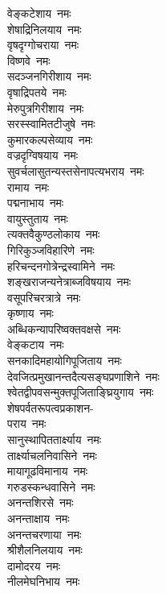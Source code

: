 \begin{multicols}{2}
\begin{flushleft}
वेङ्कटेशाय~नमः\\
शेषाद्रिनिलयाय~नमः\\
वृषदृग्गोचराया~नमः\\
विष्णवे~नमः\\
सदञ्जनगिरीशाय~नमः\\
वृषाद्रिपतये~नमः\\
मेरुपुत्रगिरीशाय~नमः\\
सरस्स्वामितटीजुषे~नमः\\
कुमारकल्पसेव्याय~नमः\\
वज्रदृग्विषयाय~नमः\hfill{}\\
सुवर्चलासुत\-न्यस्तसेनापत्यभराय~नमः\\
रामाय~नमः\\
पद्मनाभाय~नमः\\
वायुस्तुताय~नमः\\
त्यक्तवैकुण्ठलोकाय~नमः\\
गिरिकुञ्जविहारिणे~नमः\\
हरिचन्दनगोत्रेन्द्रस्वामिने~नमः\\
शङ्खराजन्यनेत्राब्जविषयाय~नमः\\
वसूपरिचरत्रात्रे~नमः\\
कृष्णाय~नमः\hfill{}\\
अब्धिकन्यापरिष्वक्तवक्षसे~नमः\\
वेङ्कटाय~नमः\\
सनकादिमहायोगि\-पूजिताय~नमः\\
देवजित्प्रमुखानन्त\-दैत्यसङ्घप्रणाशिने~नमः\\
श्वेतद्वीप\-वसन्मुक्तपूजिताङ्घ्रियुगाय~नमः\\
शेषपर्वत\-रूपत्वप्रकाशन-\\पराय~नमः\\
सानुस्थापिततार्क्ष्याय~नमः\\
तार्क्ष्याचलनिवासिने~नमः\\
मायागूढविमानाय~नमः\\
गरुडस्कन्धवासिने~नमः\hfill{}\\
अनन्तशिरसे~नमः\\
अनन्ताक्षाय~नमः\\
अनन्तचरणाया~नमः\\
श्रीशैलनिलयाय~नमः\\
दामोदरय~नमः\\
नीलमेघनिभाय~नमः\\

\end{flushleft}
\end{multicols}
